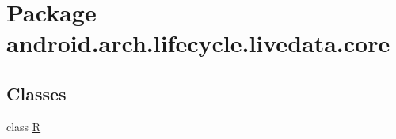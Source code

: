 \hypertarget{namespaceandroid_1_1arch_1_1lifecycle_1_1livedata_1_1core}{}\section{Package android.\+arch.\+lifecycle.\+livedata.\+core}
\label{namespaceandroid_1_1arch_1_1lifecycle_1_1livedata_1_1core}
\subsection*{Classes}
\begin{DoxyCompactItemize}
\item 
class \mbox{\hyperlink{classandroid_1_1arch_1_1lifecycle_1_1livedata_1_1core_1_1_r}{R}}
\end{DoxyCompactItemize}
